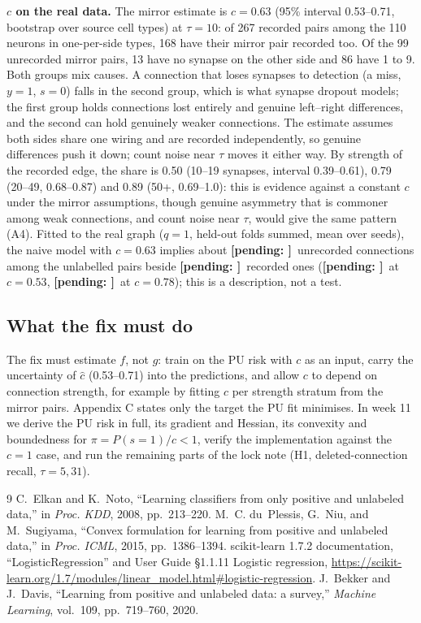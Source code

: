 \documentclass[conference]{IEEEtran}
\newcommand{\pending}[1]{\textbf{[pending: #1]}}
\providecommand{\Recorded}{\pending{}}\providecommand{\MissedMid}{\pending{}}\providecommand{\MissedLo}{\pending{}}\providecommand{\MissedHi}{\pending{}}
\begin{document}
\textbf{$c$ on the real data.} The mirror estimate is $\hat c=0.63$ (95\% interval 0.53--0.71, bootstrap over source cell types) at $\tau=10$: of 267 recorded pairs among the 110 neurons in one-per-side types, 168 have their mirror pair recorded too. Of the 99 unrecorded mirror pairs, 13 have no synapse on the other side and 86 have 1 to 9. Both groups mix causes. A connection that loses synapses to detection (a miss, $y=1$, $s=0$) falls in the second group, which is what synapse dropout models; the first group holds connections lost entirely and genuine left--right differences, and the second can hold genuinely weaker connections. The estimate assumes both sides share one wiring and are recorded independently, so genuine differences push it down; count noise near $\tau$ moves it either way. By strength of the recorded edge, the share is 0.50 (10--19 synapses, interval 0.39--0.61), 0.79 (20--49, 0.68--0.87) and 0.89 (50+, 0.69--1.0): this is evidence against a constant $c$ under the mirror assumptions, though genuine asymmetry that is commoner among weak connections, and count noise near $\tau$, would give the same pattern (A4). Fitted to the real graph ($q=1$, held-out folds summed, mean over seeds), the naive model with $c=0.63$ implies about \MissedMid\ unrecorded connections among the unlabelled pairs beside \Recorded\ recorded ones (\MissedLo\ at $c=0.53$, \MissedHi\ at $c=0.78$); this is a description, not a test.

\subsection{What the fix must do}
The fix must estimate $f$, not $g$: train on the PU risk with $c$ as an input, carry the uncertainty of $\hat c$ (0.53--0.71) into the predictions, and allow $c$ to depend on connection strength, for example by fitting $c$ per strength stratum from the mirror pairs. Appendix C states only the target the PU fit minimises. In week 11 we derive the PU risk in full, its gradient and Hessian, its convexity and boundedness for $\pi=P(s=1)/c<1$, verify the implementation against the $c=1$ case, and run the remaining parts of the lock note (H1, deleted-connection recall, $\tau=5,31$).


\begin{thebibliography}{9}
 C.~Elkan and K.~Noto, ``Learning classifiers from only positive and unlabeled data,'' in \emph{Proc. KDD}, 2008, pp.~213--220.
 M.~C. du~Plessis, G.~Niu, and M.~Sugiyama, ``Convex formulation for learning from positive and unlabeled data,'' in \emph{Proc. ICML}, 2015, pp.~1386--1394.
 scikit-learn 1.7.2 documentation, ``LogisticRegression'' and User Guide \S1.1.11 Logistic regression, \url{https://scikit-learn.org/1.7/modules/linear_model.html\#logistic-regression}.
 J.~Bekker and J.~Davis, ``Learning from positive and unlabeled data: a survey,'' \emph{Machine Learning}, vol.~109, pp.~719--760, 2020.
\end{thebibliography}
\end{document}
